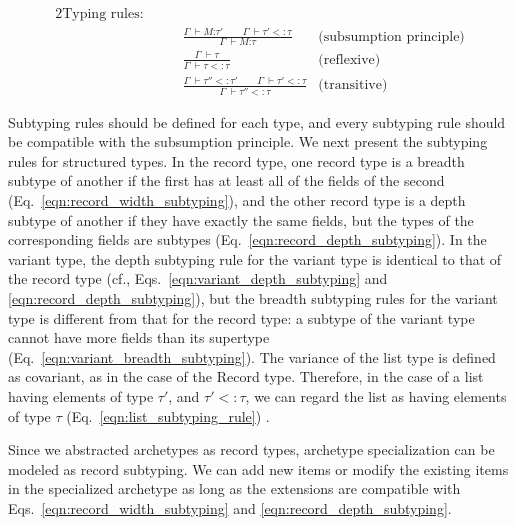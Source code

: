 \documentclass[preprint,3p,onecolumn,times,review]{article}
\begin{document}
{\begin{figure}[!htbp]
\begin{alignat}{2}
        \text{Typing rules:} \qquad   \nonumber\\
        & \frac{\Gamma~ \vdash M \text{:} \tau'  \qquad \Gamma~ \vdash \tau' <: \tau}
               {\Gamma~ \vdash M \text{:} \tau} & \text{(subsumption principle)}\label{eqn:subsumption_rule}\\[6pt]
        & \frac{\Gamma~ \vdash \tau}
               {\Gamma~ \vdash \tau <: \tau} & \label{eqn:subtyping_reflexive} \text{(reflexive)}\\[6pt]
        & \frac{\Gamma~ \vdash \tau'' <: \tau' \qquad \Gamma~ \vdash \tau' <: \tau}
               {\Gamma~ \vdash \tau'' <: \tau} & \label{eqn:subtyping_transitive} \text{(transitive)}
\end{alignat}
\end{figure}


Subtyping rules should be defined for each type, and every subtyping rule should be compatible with the subsumption principle.
We next present the subtyping rules for structured types. 
In the record type, one record type is a breadth subtype of another if the first has at least all of the fields of the second (Eq.~\ref{eqn:record_width_subtyping}), and the other record type is a depth subtype of another if they have exactly the same fields, but the types of the corresponding fields are subtypes (Eq.~\ref{eqn:record_depth_subtyping}).
In the variant type, the depth subtyping rule for the variant type is identical to that of the record type (cf., Eqs.~\ref{eqn:variant_depth_subtyping} and \ref{eqn:record_depth_subtyping}), but the breadth subtyping rules for the variant type is different from that for the record type: a subtype of the variant type cannot have more fields than its supertype (Eq.~\ref{eqn:variant_breadth_subtyping}).
The variance of the list type is defined as covariant, as in the case of the {\sf Record} type. Therefore, in the case of a list having elements of type $\tau'$, and $\tau' <: \tau$, we can regard the list as having elements of type $\tau$ (Eq.~{\ref{eqn:list_subtyping_rule})} \cite[p.197]{pierce02:_types_progr_languag}.

Since we abstracted archetypes as record types, archetype specialization can be modeled as record subtyping. We can add new items or modify the existing items in the specialized archetype as long as the extensions are compatible with Eqs.~\ref{eqn:record_width_subtyping} and \ref{eqn:record_depth_subtyping}.

}
\end{document}
